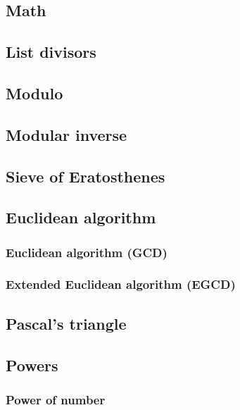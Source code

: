 \documentclass[a4paper]{article}
\begin{document}
\begin{multicols*}{3}
\section{Math}
    \subsection{List divisors}
        
    \subsection{Modulo}
        
    \subsection{Modular inverse}
        
    \subsection{Sieve of Eratosthenes}
        
    \subsection{Euclidean algorithm}
        \subsubsection{Euclidean algorithm (GCD)}
            
        \subsubsection{Extended Euclidean algorithm (EGCD)}
            
    \subsection{Pascal's triangle}
        
    \subsection{Powers}
        \subsubsection{Power of number}
            

\end{multicols*}
\end{document}
